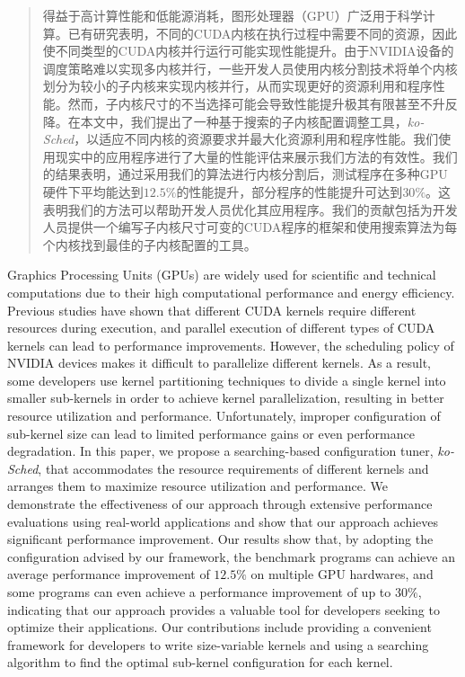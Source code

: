 

\begin{abstract}
  得益于高计算性能和低能源消耗，图形处理器（GPU）广泛用于科学计算。已有研究表明，不同的CUDA内核在执行过程中需要不同的资源，因此使不同类型的CUDA内核并行运行可能实现性能提升。由于NVIDIA设备的调度策略难以实现多内核并行，一些开发人员使用内核分割技术将单个内核划分为较小的子内核来实现内核并行，从而实现更好的资源利用和程序性能。然而，子内核尺寸的不当选择可能会导致性能提升极其有限甚至不升反降。在本文中，我们提出了一种基于搜索的子内核配置调整工具，\emph{ko-Sched}，以适应不同内核的资源要求并最大化资源利用和程序性能。我们使用现实中的应用程序进行了大量的性能评估来展示我们方法的有效性。我们的结果表明，通过采用我们的算法进行内核分割后，测试程序在多种GPU硬件下平均能达到$12.5\%$的性能提升，部分程序的性能提升可达到$30\%$。这表明我们的方法可以帮助开发人员优化其应用程序。我们的贡献包括为开发人员提供一个编写子内核尺寸可变的CUDA程序的框架和使用搜索算法为每个内核找到最佳的子内核配置的工具。
\end{abstract}

\begin{abstract*}
  Graphics Processing Units (GPUs) are widely used for scientific and technical computations due to their high computational performance and energy efficiency. Previous studies have shown that different CUDA kernels require different resources during execution, and parallel execution of different types of CUDA kernels can lead to performance improvements. However, the scheduling policy of NVIDIA devices makes it difficult to parallelize different kernels. As a result, some developers use kernel partitioning techniques to divide a single kernel into smaller sub-kernels in order to achieve kernel parallelization, resulting in better resource utilization and performance. Unfortunately, improper configuration of sub-kernel size can lead to limited performance gains or even performance degradation. In this paper, we propose a searching-based configuration tuner, \emph{ko-Sched}, that accommodates the resource requirements of different kernels and arranges them to maximize resource utilization and performance. We demonstrate the effectiveness of our approach through extensive performance evaluations using real-world applications and show that our approach achieves significant performance improvement. Our results show that, by adopting the configuration advised by our framework, the benchmark programs can achieve an average performance improvement of $12.5\%$ on multiple GPU hardwares, and some programs can even achieve a performance improvement of up to $30\%$, indicating that our approach provides a valuable tool for developers seeking to optimize their applications. Our contributions include providing a convenient framework for developers to write size-variable kernels and using a searching algorithm to find the optimal sub-kernel configuration for each kernel. 
\end{abstract*}
